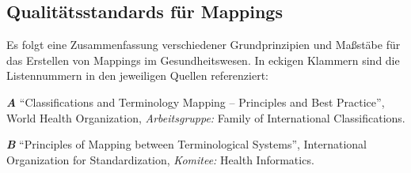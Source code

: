 \begin{comment}
ISO 21564

Determinants of map quality

\begin{enumerate}
\item Common categorical structure (ja)
\item Shared semantic domain (ja)
\item Language and Translation (keine Übersetzung)
\item Equivalence Identification / Publication (ja)
\item Equivalence Assessment (abweichungen zw. source und target)
\item Map Set Outliers
\item Clear documentation of the purpose of the map
\item Currency of the map (zeitliche Nähe)
\item Business Arrangements
\item Methodology Documentation
\item Percentage of map validated
\item Method of validation
\item Decision making (klare Prozesse)
\item Tools used to develop or maintain the map (ja)
\item Workforce
\item Governance (Entscheidungen)
\item Map Maintenance
\end{enumerate}
\end{comment}

\subsection{Qualitätsstandards für Mappings}
\label{quali-map}

Es folgt eine Zusammenfassung verschiedener Grundprinzipien und Maßstäbe für das Erstellen von Mappings im Gesundheitswesen. In eckigen Klammern sind die Listennummern in den jeweiligen Quellen referenziert:

\textbf{\emph{A}} "`Classifications and Terminology Mapping -- Principles and Best Practice"', World Health Organization, \emph{Arbeitsgruppe:} Family of International Classifications. \cite{WHO-FIC}

\textbf{\emph{B}} "`Principles of Mapping between Terminological Systems"', International Organization for Standardization, \emph{Komitee:} Health Informatics. \cite{ISO12300}

